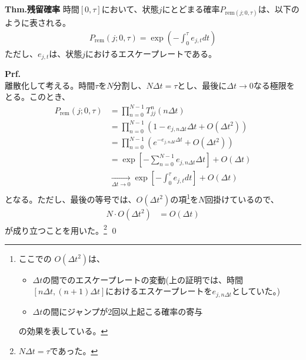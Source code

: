 \documentclass[a4paper,11pt]{jsarticle}
\numberwithin{equation}{section}
\begin{document}
\begin{itembox}[l]{\textbf{Thm.残留確率}}
    時間$[0,\tau]$において、状態$j$にとどまる確率$P_{\text{rem}(j;0,\tau)}$は、以下のように表される。
    \begin{align}
        P_{\text{rem}}(j;0,\tau) = \exp\left(-\int_{0}^{\tau} e_{j,t} dt\right)
    \end{align}
    ただし、$e_{j,t}$は、状態$j$におけるエスケープレートである。
\end{itembox}
\textbf{Prf.}\\
離散化して考える。時間$\tau$を$N$分割し、$N\Delta t = \tau$とし、最後に$\Delta t \to 0$なる極限をとる。このとき、
\begin{align}
    P_{\mathrm{rem}}(j; 0, \tau) 
    &= \prod_{n=0}^{N-1} T_{jj}^{n}(n \Delta t) \\
    &= \prod_{n=0}^{N-1} \left(1 - e_{j,n\Delta t} \Delta t + O(\Delta t^2)\right) \\
    &= \prod_{n=0}^{N-1} \left(e^{-e_{j,n\Delta t} \Delta t} + O(\Delta t^2)\right) \\
    &= \exp\left[- \sum_{n=0}^{N-1} e_{j,n\Delta t} \Delta t \right] + O(\Delta t)\\
    &\underset{\Delta t \to 0}{\longrightarrow} \exp\left[-\int_{0}^{\tau} e_{j,t} dt \right] + O(\Delta t)\\
\end{align}
となる。ただし、最後の等号では、$O(\Delta t^2)$の項\footnote{ここでの
$O(\Delta t^2)$は、
\begin{itemize}
    \item $\Delta t$の間でのエスケープレートの変動(上の証明では、時間$[n\Delta t,(n+1)\Delta t]$におけるエスケープレートを$e_{j,n\Delta t}$としていた。)
    \item $\Delta t$の間にジャンプが2回以上起こる確率の寄与
\end{itemize}
の効果を表している。
}を$N$回掛けているので、
\begin{align}
    N\cdot O(\Delta t^2) &= O(\Delta t) 
\end{align}
が成り立つことを用いた。\footnote{$N\Delta t = \tau$であった。}
\qed\\

    
\end{document}
